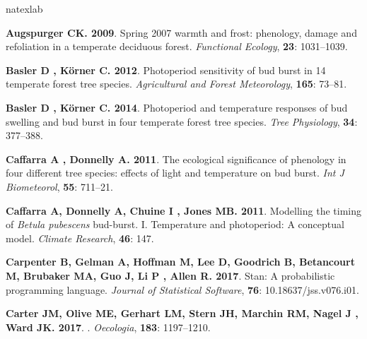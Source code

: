 \documentclass[11pt]{article}
\begin{document}
\begin{thebibliography}{69}
\expandafter\ifx\csname natexlab\endcsname\relax\def\natexlab#1{#1}\fi

{\bf Augspurger CK}{\bf . 2009}.
\newblock Spring 2007 warmth and frost: phenology, damage and refoliation in a
  temperate deciduous forest.
\newblock \emph{Functional Ecology}, {\bf 23}: 1031--1039.

{\bf Basler D , K{\"o}rner C}{\bf . 2012}.
\newblock Photoperiod sensitivity of bud burst in 14 temperate forest tree
  species.
\newblock \emph{Agricultural and Forest Meteorology}, {\bf 165}: 73--81.

{\bf Basler D , K{\"o}rner C}{\bf . 2014}.
\newblock Photoperiod and temperature responses of bud swelling and bud burst
  in four temperate forest tree species.
\newblock \emph{Tree Physiology}, {\bf 34}: 377--388.

{\bf Caffarra A , Donnelly A}{\bf . 2011}.
\newblock The ecological significance of phenology in four different tree
  species: effects of light and temperature on bud burst.
\newblock \emph{Int J Biometeorol}, {\bf 55}: 711--21.

{\bf Caffarra A, Donnelly A, Chuine I , Jones MB}{\bf . 2011}.
\newblock Modelling the timing of \textit{{B}etula pubescens} bud-burst. {I.
  Temperature and photoperiod: A conceptual model}.
\newblock \emph{Climate Research}, {\bf 46}: 147.

{\bf Carpenter B, Gelman A, Hoffman M, Lee D, Goodrich B, Betancourt M,
  Brubaker MA, Guo J, Li P , Allen R}{\bf . 2017}.
\newblock Stan: A probabilistic programming language.
\newblock \emph{Journal of Statistical Software}, {\bf 76}:
  10.18637/jss.v076.i01.

{\bf Carter JM, Olive ME, Gerhart LM, Stern JH, Marchin RM, Nagel J , Ward
  JK}{\bf . 2017}.
.
\newblock \emph{Oecologia}, {\bf 183}: 1197--1210.


\end{thebibliography}
\end{document}
